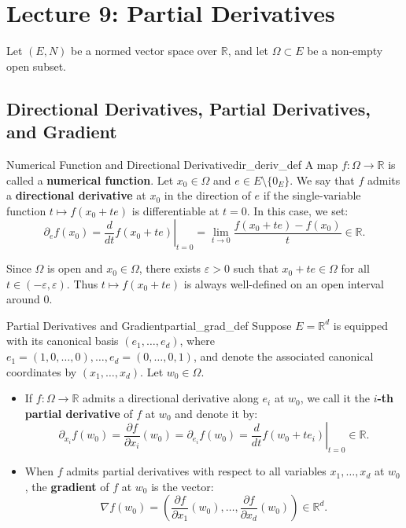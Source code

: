 \documentclass[11pt, a4paper]{article}
\newcommand{\R}{\mathbb{R}}
\newcommand{\eps}{\varepsilon}
\begin{document}
\section{Lecture 9: Partial Derivatives}
Let $(E, N)$ be a normed vector space over $\R$, and let $\Omega \subset E$ be a non-empty open subset.

\subsection{Directional Derivatives, Partial Derivatives, and Gradient}
\begin{definition}{Numerical Function and Directional Derivative}{dir_deriv_def}
A map $f: \Omega \to \R$ is called a \textbf{numerical function}. Let $x_0 \in \Omega$ and $e \in E \setminus \{0_E\}$. We say that $f$ admits a \textbf{directional derivative} at $x_0$ in the direction of $e$ if the single-variable function $t \mapsto f(x_0 + t e)$ is differentiable at $t = 0$. In this case, we set:
\[
\partial_e f(x_0) = \left.\frac{d}{dt} f(x_0 + t e)\right|_{t=0} = \lim_{t \to 0} \frac{f(x_0 + t e) - f(x_0)}{t} \in \R.
\]
\end{definition}

\begin{remark}{}{}
Since $\Omega$ is open and $x_0 \in \Omega$, there exists $\eps > 0$ such that $x_0 + t e \in \Omega$ for all $t \in (-\eps, \eps)$. Thus $t \mapsto f(x_0 + t e)$ is always well-defined on an open interval around $0$.
\end{remark}

\begin{definition}{Partial Derivatives and Gradient}{partial_grad_def}
Suppose $E = \R^d$ is equipped with its canonical basis $(e_1, \dots, e_d)$, where $e_1 = (1, 0, \dots, 0), \dots, e_d = (0, \dots, 0, 1)$, and denote the associated canonical coordinates by $(x_1, \dots, x_d)$. Let $w_0 \in \Omega$.
\begin{itemize}
    \item If $f: \Omega \to \R$ admits a directional derivative along $e_i$ at $w_0$, we call it the \textbf{$i$-th partial derivative} of $f$ at $w_0$ and denote it by:
    \[
    \partial_{x_i} f(w_0) = \frac{\partial f}{\partial x_i}(w_0) = \partial_{e_i} f(w_0) = \left.\frac{d}{dt} f(w_0 + t e_i)\right|_{t=0} \in \R.
    \]
    \item When $f$ admits partial derivatives with respect to all variables $x_1, \dots, x_d$ at $w_0$, the \textbf{gradient} of $f$ at $w_0$ is the vector:
    \[
    \nabla f(w_0) = \left(\frac{\partial f}{\partial x_1}(w_0), \dots, \frac{\partial f}{\partial x_d}(w_0)\right) \in \R^d.
    \]
\end{itemize}
\end{definition}
\end{document}
